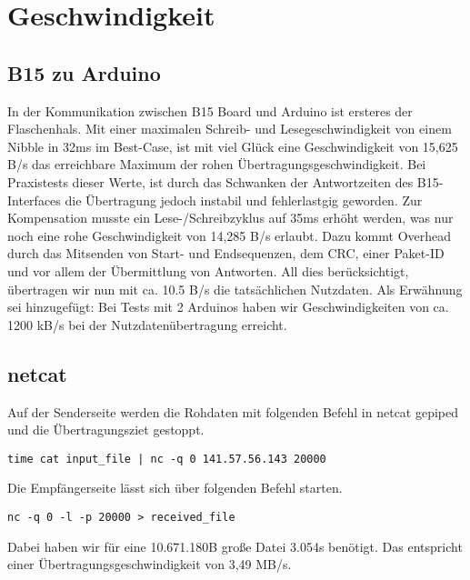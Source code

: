

\chapter{Geschwindigkeit}
\section{B15 zu Arduino}
In der Kommunikation zwischen B15 Board und Arduino ist ersteres der Flaschenhals. Mit einer maximalen Schreib- und Lesegeschwindigkeit von einem Nibble in 32ms im Best-Case, ist mit viel Glück eine Geschwindigkeit von 15,625 B/s das erreichbare Maximum der rohen Übertragungsgeschwindigkeit. Bei Praxistests dieser Werte, ist durch das Schwanken der Antwortzeiten des B15-Interfaces die Übertragung jedoch instabil und fehlerlastgig geworden. Zur Kompensation musste ein Lese-/Schreibzyklus auf 35ms erhöht werden, was nur noch eine rohe Geschwindigkeit von 14,285 B/s erlaubt. Dazu kommt Overhead durch das Mitsenden von Start- und Endsequenzen, dem CRC, einer Paket-ID und vor allem der Übermittlung von Antworten. All dies berücksichtigt, übertragen wir nun mit ca. 10.5 B/s die tatsächlichen Nutzdaten. Als Erwähnung sei hinzugefügt: Bei Tests mit 2 Arduinos haben wir Geschwindigkeiten von ca. 1200 kB/s bei der Nutzdatenübertragung erreicht.

\section{netcat}
Auf der Senderseite werden die Rohdaten mit folgenden Befehl in netcat gepiped und die Übertragungsziet gestoppt.
\begin{tcolorbox}[colback=gray!10,colframe=black,boxrule=0.5pt]
\begin{verbatim}
time cat input_file | nc -q 0 141.57.56.143 20000
\end{verbatim}
\end{tcolorbox}

\noindent
Die Empfängerseite lässt sich über folgenden Befehl starten.

\begin{tcolorbox}[colback=gray!10,colframe=black,boxrule=0.5pt]
\begin{verbatim}
nc -q 0 -l -p 20000 > received_file
\end{verbatim}
\end{tcolorbox}

\noindent
Dabei haben wir für eine 10.671.180B große Datei 3.054s benötigt. Das entspricht einer Übertragungsgeschwindigkeit von 3,49 MB/s.

